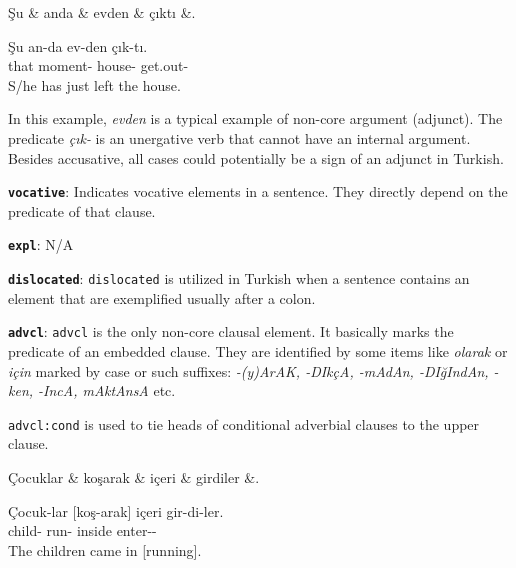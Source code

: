 \documentclass[11pt,a4paper]{article}
\begin{document}
\begin{exe}
\ex \label{obl}
\begin{dependency}
\begin{deptext}[column sep=0.3cm]
Şu \& anda \& evden \& çıktı \&. \\
\end{deptext}
\end{dependency}

\gll Şu an-da ev-den çık-tı. \\
that moment-\Loc{} house-\Abl{} get.out-\Pst{} \\
\glt S/he has just left the house.
\end{exe} 

In this example, \textit{evden} is a typical example of non-core argument (adjunct). The predicate \textit{çık-} is an unergative verb that cannot have an internal argument. Besides accusative, all cases could potentially be a sign of an adjunct in Turkish.

\textbf{\texttt{vocative}}:
Indicates vocative elements in a sentence. They directly depend on the predicate of that clause.

\textbf{\texttt{expl}}:
N/A

\textbf{\texttt{dislocated}}:
\texttt{dislocated} is utilized in Turkish when a sentence contains an element that are exemplified usually after a colon.

\textbf{\texttt{advcl}}:
\texttt{advcl} is the only non-core clausal element. It basically marks the predicate of an embedded clause. They are identified by some items like \textit{olarak} or \textit{için} marked by case or such suffixes: \textit{-(y)ArAK, -DIkçA, -mAdAn, -DIğIndAn, -ken, -IncA, mAktAnsA} etc.

\texttt{advcl:cond} is used to tie heads of conditional adverbial clauses to the upper clause.

\begin{exe}
\ex \label{advcl}
\begin{dependency}
\begin{deptext}[column sep=0.3cm]
Çocuklar \& koşarak \& içeri \& girdiler \&. \\
\end{deptext}
\end{dependency}
\gll Çocuk-lar [koş-arak] içeri gir-di-ler. \\
child-\Pl{} run-\Adv{} inside enter-\Pst{}-\Tpl{} \\
\glt The children came in [running].
\end{exe}
\end{document}
